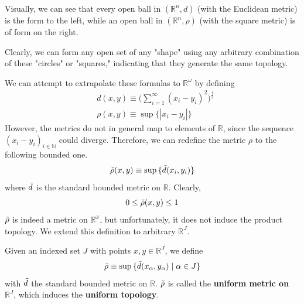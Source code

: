 \documentclass{article}
\begin{document}
    Visually, we can see that every open ball in $(\mathbb{R}^n, d)$ (with the Euclidean metric) is the form to the left, while an open ball in $(\mathbb{R}^n, \rho)$ (with the square metric) is of form on the right. 
    \begin{center}
    \end{center}
    Clearly, we can form any open set of any "shape" using any arbitrary combination of these "circles" or "squares," indicating that they generate the same topology. 

    We can attempt to extrapolate these formulas to $\mathbb{R}^\omega$ by defining
    \begin{align*}
        & d(x, y) \equiv \bigg(\sum_{i=1}^\infty (x_i - y_i)^2 \bigg)^{\frac{1}{2}} \\
        & \rho(x, y) \equiv \sup{\{|x_i - y_i|\}}
    \end{align*}
    However, the metrics do not in general map to elements of $\mathbb{R}$, since the sequence $(x_i - y_i)_{i \in \mathbb{N}}$ could diverge. Therefore, we can redefine the metric $\rho$ to the following bounded one. 
    \[\Tilde{\rho} (x, y) \equiv \sup{\{\Tilde{d}(x_i, y_i)\}}\]
    where $\Tilde{d}$ is the standard bounded metric on $\mathbb{R}$. Clearly,
    \[0 \leq \Tilde{\rho}(x, y) \leq 1\]
    $\Tilde{\rho}$ is indeed a metric on $\mathbb{R}^\omega$, but unfortunately, it does not induce the product topology. We extend this definition to arbitrary $\mathbb{R}^J$. 

    \begin{definition}
    Given an indexed set $J$ with points $x, y \in \mathbb{R}^J$, we define
    \[\Tilde{\rho} \equiv \sup{\{\Tilde{d}(x_\alpha, y_\alpha)\;|\; \alpha \in J\}}\]
    with $\Tilde{d}$ the standard bounded metric on $\mathbb{R}$. $\Tilde{\rho}$ is called the \textbf{uniform metric on $\mathbb{R}^J$}, which induces the \textbf{uniform topology}. 
    \end{definition}
\end{document}
